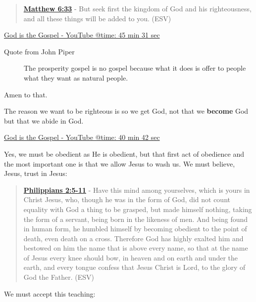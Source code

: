 \documentclass[11pt]{article}
\begin{document}
\begin{quote}
\textbf{\href{https://www.biblegateway.com/passage/?search=Matthew\%206\%3A33\&version=ESV}{Matthew 6:33}} - But seek first the kingdom of God and his righteousness, and all these things will be added to you. (ESV)
\end{quote}

\href{https://youtube.com/watch?v=duJhsyAjhNg\&t=2731}{God is the Gospel - YouTube @time: 45 min 31 sec}

\begin{description}
\item[{Quote from John Piper}] The prosperity gospel is no gospel because what it does is offer to people what they want as natural people.
\end{description}

Amen to that.

The reason we want to be righteous is so we get God, not that we \textbf{become} God but that we abide in God.

\href{https://youtube.com/watch?v=duJhsyAjhNg\&t=2442}{God is the Gospel - YouTube @time: 40 min 42 sec}

Yes, we must be obedient as He is obedient, but that first act of obedience and the most important one is that we allow Jesus to wash us. We must believe, Jesus, trust in Jesus:

\begin{quote}
\textbf{\href{https://www.biblegateway.com/passage/?search=Philippians\%202\%3A5-11\&version=ESV}{Philippians 2:5-11}} - Have this mind among yourselves, which is yours in Christ Jesus, who, though he was in the form of God, did not count equality with God a thing to be grasped, but made himself nothing, taking the form of a servant, being born in the likeness of men. And being found in human form, he humbled himself by becoming obedient to the point of death, even death on a cross. Therefore God has highly exalted him and bestowed on him the name that is above every name, so that at the name of Jesus every knee should bow, in heaven and on earth and under the earth, and every tongue confess that Jesus Christ is Lord, to the glory of God the Father. (ESV)
\end{quote}

We must accept this teaching:
\end{document}
